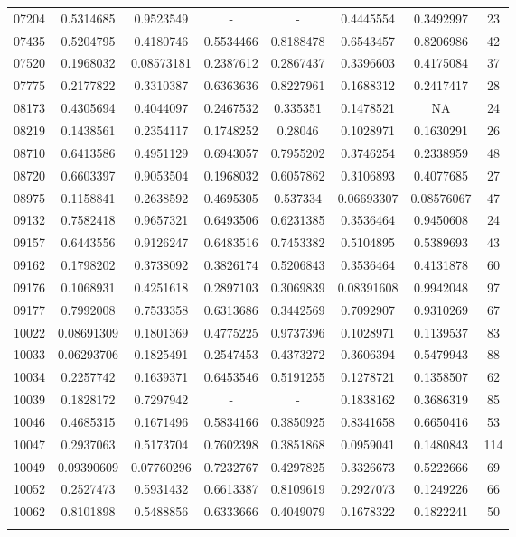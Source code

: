 \begin{anexosenv}
\begin{table}[H]
{\begin{tabular}{cccccccc}
07204 & 0.5314685 & 0.9523549 & - & - & 0.4445554 & 0.3492997 & 23 \\ 
07435 & 0.5204795 & 0.4180746 & 0.5534466 & 0.8188478 & 0.6543457 & 0.8206986 & 42 \\ 
07520 & 0.1968032 & 0.08573181 & 0.2387612 & 0.2867437 & 0.3396603 & 0.4175084 & 37 \\ 
07775 & 0.2177822 & 0.3310387 & 0.6363636 & 0.8227961 & 0.1688312 & 0.2417417 & 28 \\ 
08173 & 0.4305694 & 0.4044097 & 0.2467532 & 0.335351 & 0.1478521 & NA & 24 \\ 
08219 & 0.1438561 & 0.2354117 & 0.1748252 & 0.28046 & 0.1028971 & 0.1630291 & 26 \\ 
08710 & 0.6413586 & 0.4951129 & 0.6943057 & 0.7955202 & 0.3746254 & 0.2338959 & 48 \\ 
08720 & 0.6603397 & 0.9053504 & 0.1968032 & 0.6057862 & 0.3106893 & 0.4077685 & 27 \\ 
08975 & 0.1158841 & 0.2638592 & 0.4695305 & 0.537334 & 0.06693307 & 0.08576067 & 47 \\ 
09132 & 0.7582418 & 0.9657321 & 0.6493506 & 0.6231385 & 0.3536464 & 0.9450608 & 24 \\ 
09157 & 0.6443556 & 0.9126247 & 0.6483516 & 0.7453382 & 0.5104895 & 0.5389693 & 43 \\ 
09162 & 0.1798202 & 0.3738092 & 0.3826174 & 0.5206843 & 0.3536464 & 0.4131878 & 60 \\ 
09176 & 0.1068931 & 0.4251618 & 0.2897103 & 0.3069839 & 0.08391608 & 0.9942048 & 97 \\ 
09177 & 0.7992008 & 0.7533358 & 0.6313686 & 0.3442569 & 0.7092907 & 0.9310269 & 67 \\ 
10022 & 0.08691309 & 0.1801369 & 0.4775225 & 0.9737396 & 0.1028971 & 0.1139537 & 83 \\ 
10033 & 0.06293706 & 0.1825491 & 0.2547453 & 0.4373272 & 0.3606394 & 0.5479943 & 88 \\ 
10034 & 0.2257742 & 0.1639371 & 0.6453546 & 0.5191255 & 0.1278721 & 0.1358507 & 62 \\ 
10039 & 0.1828172 & 0.7297942 & - & - & 0.1838162 & 0.3686319 & 85 \\ 
10046 & 0.4685315 & 0.1671496 & 0.5834166 & 0.3850925 & 0.8341658 & 0.6650416 & 53 \\ 
10047 & 0.2937063 & 0.5173704 & 0.7602398 & 0.3851868 & 0.0959041 & 0.1480843 & 114 \\ 
10049 & 0.09390609 & 0.07760296 & 0.7232767 & 0.4297825 & 0.3326673 & 0.5222666 & 69 \\ 
10052 & 0.2527473 & 0.5931432 & 0.6613387 & 0.8109619 & 0.2927073 & 0.1249226 & 66 \\ 
10062 & 0.8101898 & 0.5488856 & 0.6333666 & 0.4049079 & 0.1678322 & 0.1822241 & 50 \\ \hline      
\label{tab:nosocssemrotacaoII}
\end{tabular}
}
\end{table}


\end{anexosenv}
